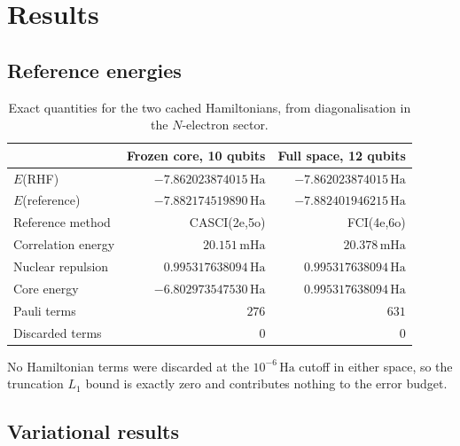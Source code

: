 \documentclass[11pt,a4paper]{article}
\newcommand{\mHa}{\ensuremath{\,\mathrm{mHa}}}
\newcommand{\Ha}{\ensuremath{\,\mathrm{Ha}}}
\begin{document}
\section{Results}

\subsection{Reference energies}

\begin{table}[htbp]
\centering
\caption{Exact quantities for the two cached Hamiltonians, from
diagonalisation in the $N$-electron sector.}
\label{tab:refs}
\small
\begin{tabular}{lrr}
\toprule
& Frozen core, 10 qubits & Full space, 12 qubits \\
\midrule
$E$(RHF)                  & $-7.862023874015\Ha$ & $-7.862023874015\Ha$ \\
$E$(reference)            & $-7.882174519890\Ha$ & $-7.882401946215\Ha$ \\
Reference method          & CASCI(2e,5o)          & FCI(4e,6o) \\
Correlation energy        & $20.151\mHa$          & $20.378\mHa$ \\
Nuclear repulsion         & $0.995317638094\Ha$   & $0.995317638094\Ha$ \\
Core energy               & $-6.802973547530\Ha$  & $0.995317638094\Ha$ \\
Pauli terms               & $276$                 & $631$ \\
Discarded terms           & $0$                   & $0$ \\
\bottomrule
\end{tabular}
\end{table}

No Hamiltonian terms were discarded at the $10^{-6}\Ha$ cutoff in either space,
so the truncation $L_1$ bound is exactly zero and contributes nothing to the
error budget.

\subsection{Variational results}
\end{document}
